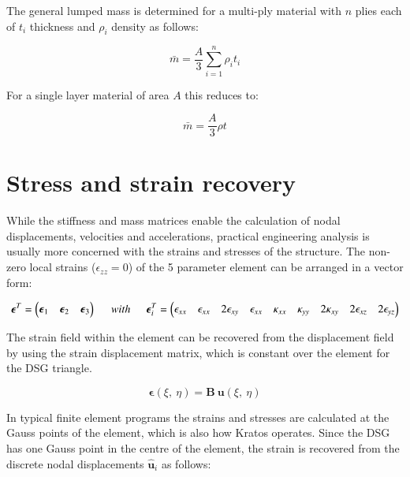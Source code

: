 The general lumped mass is determined for a multi-ply material with $n$ plies each of $t_i$ thickness and $\rho_i$ density as follows:

\begin{equation} 
\bar{m} = \frac{A}{3} \sum_{i=1}^n \rho_i t_i
\label{eqt16}
\end{equation}

For a single layer material of area $A$ this reduces to:

\begin{equation} 
\bar{m} = \frac{A}{3} \rho t
\label{eqt17}
\end{equation}

\section{Stress and strain recovery}

While the stiffness and mass matrices enable the calculation of nodal displacements, velocities and accelerations, practical engineering analysis is usually more concerned with the strains and stresses of the structure. The non-zero local strains ($\epsilon_{zz} = 0$) of the 5 parameter element can be arranged in a vector form:

\begin{equation} 
\boldsymbol{\epsilon}^T = \begin{pmatrix}
\boldsymbol{\epsilon}_1 & \boldsymbol{\epsilon}_2 & \boldsymbol{\epsilon}_3
\end{pmatrix}
\hspace{5mm}
with
\hspace{5mm}
\boldsymbol{\epsilon}^T_i = \begin{pmatrix}
\epsilon_{xx} & \epsilon_{xx} & 2\epsilon_{xy} & \epsilon_{xx} & \kappa_{xx} & \kappa_{yy} & 2\kappa_{xy} & 2\epsilon_{xz} & 2\epsilon_{yz}
\end{pmatrix}
\label{eqt18}
\end{equation}

The strain field within the element can be recovered from the displacement field by using the strain displacement matrix, which is constant over the element for the DSG triangle.

\begin{equation} 
\boldsymbol{\epsilon}(\xi,\ \eta) = \mathbf{B}\ \mathbf{u}(\xi,\ \eta)
\label{eqt19}
\end{equation}

In typical finite element programs the strains and stresses are calculated at the Gauss points of the element, which is also how Kratos operates. Since the DSG has one Gauss point in the centre of the element, the strain is recovered from the discrete nodal displacements $\hat{\mathbf{u}}_i$ as follows:

